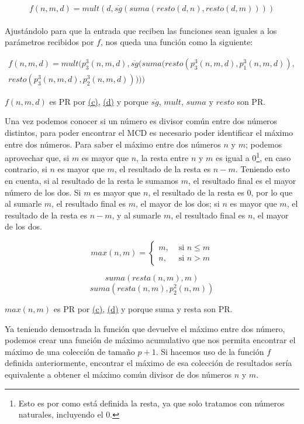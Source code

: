 \documentclass[a4paper,12pt]{article}
\begin{document}
$$f(n,m,d)=mult(d,\overline{sg}(suma(resto(d,n),resto(d,m))))$$
\\
Ajustándolo para que la entrada que reciben las funciones sean iguales a los parámetros recibidos por $f$, nos queda una función como la siguiente:

\begin{multline*}
f(n,m,d)= mult(p^{3}_{3}(n,m,d), \overline{sg}
(suma(resto(p^{3}_{3}(n,m,d),p^{3}_{1}(n,m,d)), \\ resto(p^{3}_{3}
(n,m,d), p^{3}_{2}(n,m,d)))))
\end{multline*}

$f(n,m,d)$ es PR por \hyperlink{func_c}{(c)}, \hyperlink{func_d}{(d)} y porque $\overline{sg}$, $mult$, $suma$ y $resto$ son PR.

Una vez podemos conocer si un número es divisor común entre dos números distintos, para poder encontrar el MCD es necesario poder identificar el máximo entre dos números. Para saber el máximo entre dos números $n$ y $m$; podemos aprovechar que, si $m$ es mayor que $n$, la resta entre $n$ y $m$ es igual a 0\footnote{Esto es por como está definida la resta, ya que solo tratamos con números naturales, incluyendo el 0.}, en caso contrario, si $n$ es mayor que $m$, el resultado de la resta es $n - m$. Teniendo esto en cuenta, si al resultado de la resta le sumamos $m$, el resultado final es el mayor número de los dos. Si $m$ es mayor que $n$, el resultado de la resta es 0, por lo que al sumarle $m$, el resultado final es $m$, el mayor de los dos; si $n$ es mayor que $m$, el resultado de la resta es $n-m$, y al sumarle $m$, el resultado final es $n$, el mayor de los dos.

$$max(n, m)= 
    \begin{cases}m, & \text { si } n \leq m \\
    n, & \text { si } n>m
    \end{cases}$$

$$suma(resta(n,m),m)$$
$$suma(resta(n,m),p^{2}_{2}(n,m))$$

$max(n,m)$ es PR por \hyperlink{func_c}{(c)}, \hyperlink{func_d}{(d)} y porque suma y resta son PR.

Ya teniendo demostrada la función que devuelve el máximo entre dos número, podemos crear una función de máximo acumulativo que nos permita encontrar el máximo de una colección de tamaño $p+1$. Si hacemos uso de la función $f$ definida anteriormente, encontrar el máximo de esa colección de resultados sería equivalente a obtener el máximo común divisor de dos números $n$ y $m$.
\end{document}
